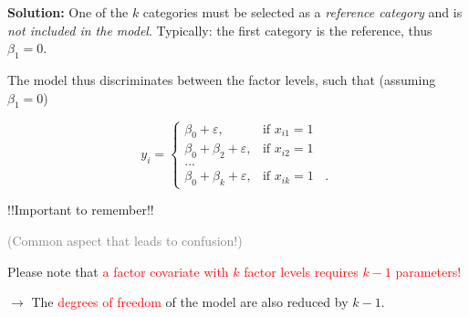 \documentclass[10pt,ignorenonframetext,]{beamer}
\begin{document}
\begin{frame}

\textbf{Solution:} One of the \(k\) categories must be selected as a
\emph{reference category} and is \emph{not included in the model}.
Typically: the first category is the reference, thus \(\beta_1=0\).

\vspace{2mm}

The model thus discriminates between the factor levels, such that
(assuming \(\beta_1=0\))

\begin{equation*}
y_i = \left\{
\begin{array}{ll}
\beta_0 + \varepsilon, & \text{if $x_{i1}=1$ }\\
\beta_0 + \beta_2 + \varepsilon, & \text{if $x_{i2}=1$ }\\
...\\
\beta_0 + \beta_k + \varepsilon, & \text{if $x_{ik}=1$ } \ .
\end{array}\right.
\end{equation*}

\end{frame}

\begin{frame}

\begin{block}{!!Important to remember!!}

\textcolor{gray}{(Common aspect that leads to confusion!)}

\vspace{10mm}

Please note that
\textcolor{red}{a factor covariate with $k$ factor levels requires $k-1$ parameters!}
\vspace{2mm}

\(\rightarrow\) The \textcolor{red}{degrees of freedom} of the model are
also reduced by \(k-1\).

\end{block}

\end{frame}
\end{document}
